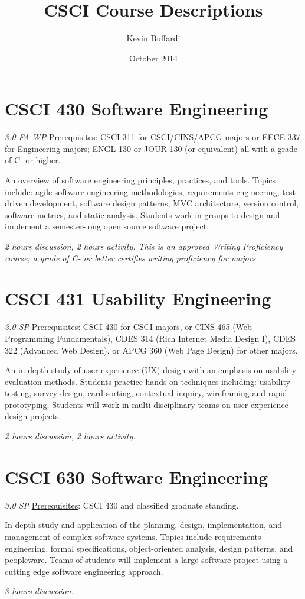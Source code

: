\documentclass[12pt]{article}
\title{CSCI Course Descriptions}
\author{Kevin Buffardi}
\date{October 2014}
\begin{document}
  \maketitle
  \section*{CSCI 430 Software Engineering}	 	
  \textit{3.0 FA WP}
  \underline{Prerequisites}: CSCI 311 for CSCI/CINS/APCG majors or EECE 337 for Engineering majors; ENGL 130 or JOUR 130 (or equivalent) all with a grade of C- or higher.

  An overview of software engineering principles, practices, and tools. Topics include: agile software engineering methodologies, requirements engineering, test-driven development, software design patterns, MVC architecture, version control, software metrics, and static analysis. Students work in groups to design and implement a semester-long open source software project. 

  \textit{2 hours discussion, 2 hours activity. This is an approved Writing Proficiency course; a grade of C- or better certifies writing proficiency for majors.}
  
  \section*{CSCI 431 Usability Engineering}
  \textit{3.0 SP}	 
  \underline{Prerequisites}: CSCI 430 for CSCI majors, or CINS 465 (Web Programming Fundamentals), CDES 314 (Rich Internet Media Design I), CDES 322 (Advanced Web Design), or APCG 360 (Web Page Design) for other majors.

  An in-depth study of user experience (UX) design with an emphasis on usability evaluation methods. Students practice hands-on techniques including: usability testing, survey design, card sorting, contextual inquiry, wireframing and rapid prototyping. Students will work in multi-disciplinary teams on user experience design projects.

  \textit{2 hours discussion, 2 hours activity.}

  \section*{CSCI 630 Software Engineering}
  \textit{3.0 SP}
  \underline{Prerequisites}: CSCI 430 and classified graduate standing.

  In-depth study and application of the planning, design, implementation, and management of complex software systems. Topics include requirements engineering, formal specifications, object-oriented analysis, design patterns, and peopleware. Teams of students will implement a large software project using a cutting edge software engineering approach. 

  \textit{3 hours discussion.}
\end{document}
